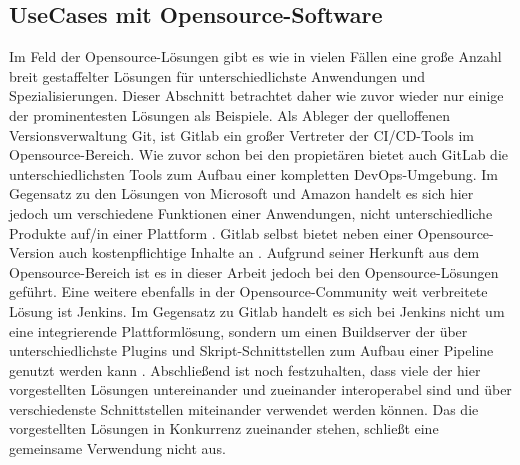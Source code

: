 \subsection{UseCases mit Opensource-Software}
\label{UseCases mit Opensource-Software}
Im Feld der Opensource-Lösungen gibt es wie in vielen Fällen eine große Anzahl breit gestaffelter Lösungen für unterschiedlichste Anwendungen und Spezialisierungen. Dieser Abschnitt betrachtet daher wie zuvor wieder nur einige der prominentesten Lösungen als Beispiele.
Als Ableger der quelloffenen Versionsverwaltung Git, ist Gitlab ein großer Vertreter der \acrshort{CI}/\acrshort{CD}-Tools im Opensource-Bereich. Wie zuvor schon bei den propietären bietet auch GitLab die unterschiedlichsten Tools zum Aufbau einer kompletten \gls{DevOps}-Umgebung. Im Gegensatz zu den Lösungen von Microsoft und Amazon handelt es sich hier jedoch um verschiedene Funktionen einer Anwendungen, nicht unterschiedliche Produkte auf/in einer Plattform \cite{gitlab_devops}. Gitlab selbst bietet neben einer Opensource-Version auch kostenpflichtige Inhalte an \cite{gitlab_pricing}. Aufgrund seiner Herkunft aus dem Opensource-Bereich ist es in dieser Arbeit jedoch bei den Opensource-Lösungen geführt.
Eine weitere ebenfalls in der Opensource-Community weit verbreitete Lösung ist Jenkins. Im Gegensatz zu Gitlab handelt es sich bei Jenkins nicht um eine integrierende Plattformlösung, sondern um einen Buildserver der über unterschiedlichste Plugins und Skript-Schnittstellen zum Aufbau einer Pipeline genutzt werden kann \cite{jenkins_about}.
Abschließend ist noch festzuhalten, dass viele der hier vorgestellten Lösungen untereinander und zueinander interoperabel sind und über verschiedenste Schnittstellen miteinander verwendet werden können. Das die vorgestellten Lösungen in Konkurrenz zueinander stehen, schließt eine gemeinsame Verwendung nicht aus.